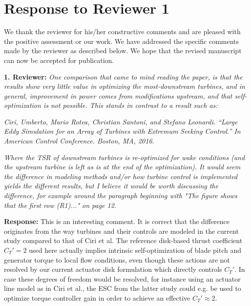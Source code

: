 \documentclass[]{article}
\begin{document}


\section*{Response to Reviewer 1}

We thank the reviewer for his/her constructive comments and are pleased with the positive assessment or our work. We have addressed the specific comments made by the reviewer as described below. We hope that the revised manuscript can now be accepted for publication.

\dotfill

\textbf{1. Reviewer:} \textit{One comparison that came to mind reading the paper, is that the results show very little value in optimizing the most-downstream turbines, and in general, improvement in power comes from modifications upstream, and that self-optimization is not possible. This stands in contrast to a result such as:}
	
\textit{Ciri, Umberto, Mario Rotea, Christian Santoni, and Stefano Leonardi. “Large Eddy Simulation for an Array of Turbines with Extremum Seeking Control.” In American Control Conference. Boston, MA, 2016. }
	
\textit{Where the TSR of downstream turbines is re-optimized for wake conditions (and the upstream turbine is left as is at the end of the optimization). It would seem the difference in modeling methods and/or how turbine control is implemented yields the different results, but I believe it would be worth discussing the difference, for example around the paragraph beginning with "The figure shows that the first row (R1)..." on page 12.}

\textbf{Response:} This is an interesting comment. It is correct that the difference originates from the way turbines and their controls are modeled in the current study compared to that of Ciri et al. The reference disk-based thrust coefficient $C_T' = 2$ used here actually implies intrinsic self-optimization of blade pitch and generator torque to local flow conditions, even though these actions are not resolved by our current actuator disk formulation which directly controls $C_T'$. In case these degrees of freedom would be resolved, for instance using an actuator line model as in Ciri et al., the ESC from the latter study could e.g. be used to optimize torque controller gain in order to achieve an effective $C_T' \approx 2$. 
\end{document}
